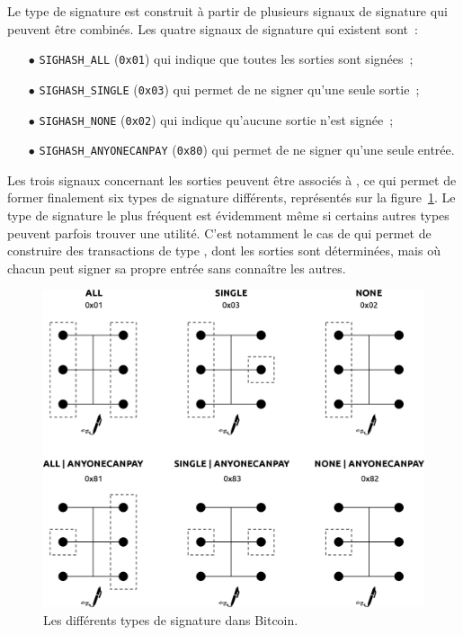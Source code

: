 Le type de signature est construit à partir de plusieurs signaux de signature qui peuvent être combinés. Les quatre signaux de signature qui existent sont~:

\begin{itemize}
\item[$\bullet$] \texttt{SIGHASH\_ALL} (\texttt{0x01}) qui indique que toutes les sorties sont signées~;
\item[$\bullet$] \texttt{SIGHASH\_SINGLE} (\texttt{0x03}) qui permet de ne signer qu'une seule sortie~;
\item[$\bullet$] \texttt{SIGHASH\_NONE} (\texttt{0x02}) qui indique qu'aucune sortie n'est signée~;
\item[$\bullet$] \texttt{SIGHASH\_ANYONECANPAY} (\texttt{0x80}) qui permet de ne signer qu'une seule entrée.
\end{itemize}

Les trois signaux concernant les sorties peuvent être associés à , ce qui permet de former finalement six types de signature différents, représentés sur la figure~\ref{fig:signature-hash-types}. Le type de signature le plus fréquent est évidemment  même si certains autres types peuvent parfois trouver une utilité. C'est notamment le cas de  qui permet de construire des transactions de type , dont les sorties sont déterminées, mais où chacun peut signer sa propre entrée sans connaître les autres.

\begin{figure}[ht]
  \centering
  \includegraphics[scale=0.45]{img/signature-hash-types.eps}
  \caption{Les différents types de signature dans Bitcoin.}
  \label{fig:signature-hash-types}
\end{figure}

